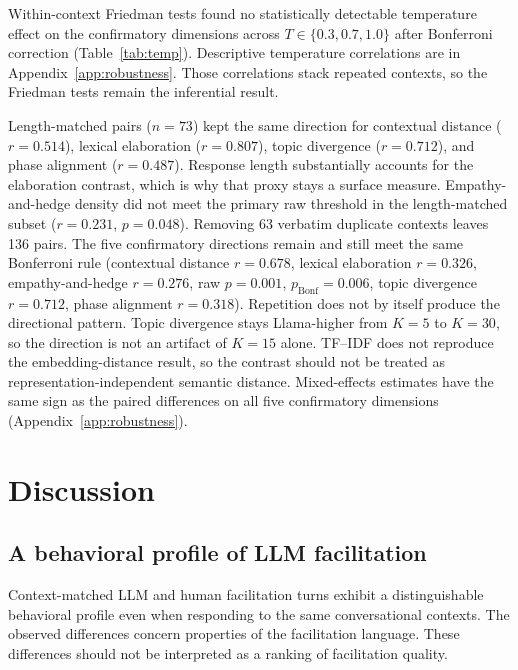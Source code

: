 \documentclass[11pt]{article}
\begin{document}
Within-context Friedman tests found no statistically detectable temperature effect on the confirmatory dimensions across $T \in \{0.3, 0.7, 1.0\}$ after Bonferroni correction (Table~\ref{tab:temp}). Descriptive temperature correlations are in Appendix~\ref{app:robustness}. Those correlations stack repeated contexts, so the Friedman tests remain the inferential result.

Length-matched pairs ($n = 73$) kept the same direction for contextual distance ($r = 0.514$), lexical elaboration ($r = 0.807$), topic divergence ($r = 0.712$), and phase alignment ($r = 0.487$). Response length substantially accounts for the elaboration contrast, which is why that proxy stays a surface measure. Empathy-and-hedge density did not meet the primary raw threshold in the length-matched subset ($r = 0.231$, $p = 0.048$). Removing 63 verbatim duplicate contexts leaves 136 pairs. The five confirmatory directions remain and still meet the same Bonferroni rule (contextual distance $r = 0.678$, lexical elaboration $r = 0.326$, empathy-and-hedge $r = 0.276$, raw $p = 0.001$, $p_\text{Bonf} = 0.006$, topic divergence $r = 0.712$, phase alignment $r = 0.318$). Repetition does not by itself produce the directional pattern. Topic divergence stays Llama-higher from $K = 5$ to $K = 30$, so the direction is not an artifact of $K = 15$ alone. TF--IDF does not reproduce the embedding-distance result, so the contrast should not be treated as representation-independent semantic distance. Mixed-effects estimates have the same sign as the paired differences on all five confirmatory dimensions (Appendix~\ref{app:robustness}).

\section{Discussion}
\label{sec:discussion}
\subsection{A behavioral profile of LLM facilitation}
Context-matched LLM and human facilitation turns exhibit a distinguishable behavioral profile even when responding to the same conversational contexts. The observed differences concern properties of the facilitation language. These differences should not be interpreted as a ranking of facilitation quality.
\end{document}
